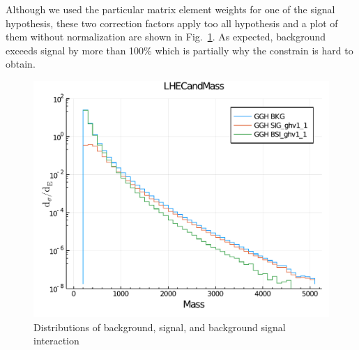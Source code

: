 Although we used the particular matrix element weights for one of the signal hypothesis, these two
correction factors apply too all hypothesis and a plot of them without normalization are shown
in Fig.~\ref{fig:bsi_sig_bkg_compare}. As expected, background exceeds signal by more than 100\%
which is partially why the constrain is hard to obtain.
\begin{figure}[htb]
    \begin{center}
        \includegraphics[width=.7\linewidth]{fig/LHE_integral_difference.pdf}
    \end{center}
    \caption{Distributions of background, signal, and background signal interaction}
    \label{fig:bsi_sig_bkg_compare}
\end{figure}

